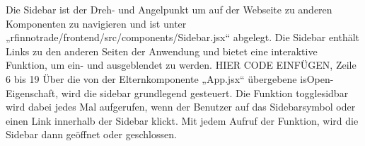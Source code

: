 Die Sidebar ist der Dreh- und Angelpunkt um auf der Webseite zu anderen Komponenten zu navigieren und ist unter „rfinnotrade/frontend/src/components/Sidebar.jsx“ abgelegt.
Die Sidebar enthält Links zu den anderen Seiten der Anwendung und bietet eine interaktive Funktion, um ein- und ausgeblendet zu werden.
HIER CODE EINFÜGEN, Zeile 6 bis 19
Über die von der Elternkomponente „App.jsx“ übergebene isOpen-Eigenschaft, wird die sidebar grundlegend gesteuert. Die Funktion togglesidbar wird dabei jedes Mal aufgerufen, wenn der Benutzer auf das Sidebarsymbol oder einen Link innerhalb der Sidebar klickt. Mit jedem Aufruf der Funktion, wird die Sidebar dann geöffnet oder geschlossen.